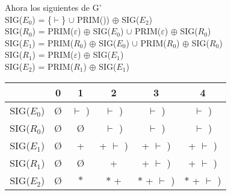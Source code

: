 \documentclass[\main/ApuntesPL.tex]{subfiles}
\begin{document}
      \par
      Ahora los siguientes de G'\\
      \hspace{5mm}SIG($E_0$) = \{$\vdash$\} $\cup$ PRIM()) $\oplus$ SIG($E_2$)\\
      \hspace{5mm}SIG($R_0$) = PRIM($\varepsilon$) $\oplus$ SIG($E_0$) $\cup$ PRIM($\varepsilon$)
        $\oplus$ SIG($R_0$)\\
      \hspace{5mm}SIG($E_1$) = PRIM($R_0$) $\oplus$ SIG($E_0$) $\cup$ PRIM($R_0$) $\oplus$
        SIG($R_0$)\\
      \hspace{5mm}SIG($R_1$) = PRIM($\varepsilon$) $\oplus$ SIG($E_1$)\\
      \hspace{5mm}SIG($E_2$) = PRIM($R_1$) $\oplus$ SIG($E_1$)\\
      \begin{center}
        \begin{tabular}{||c c c c c c||}
          \hline
          & 0 & 1 & 2 & 3 & 4 \\ [0.5ex]
          \hline\hline
          SIG($E_0$) & \O & $\vdash$ ) & $\vdash$ ) & $\vdash$ ) & $\vdash$ )\\
          \hline
          SIG($R_0$) & \O & \O & $\vdash$ ) & $\vdash$ ) & $\vdash$ )\\
          \hline
          SIG($E_1$) & \O & + & + $\vdash$ ) & + $\vdash$ ) & + $\vdash$ )\\
          \hline
          SIG($R_1$) & \O & \O & + & + $\vdash$ ) & + $\vdash$ )\\
          \hline
          SIG($E_2$) & \O & $\ast$ & $\ast$ + & $\ast$ + $\vdash$ ) & $\ast$ + $\vdash$ )\\ [1ex]
          \hline
        \end{tabular}
      \end{center}
\end{document}
